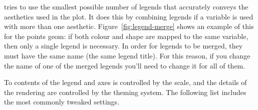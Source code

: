 % 


\ggplot tries to use the smallest possible number of legends that accurately conveys the aesthetics used in the plot.  It does this by combining legends if a variable is used with more than one aesthetic.  Figure~\ref{fig:legend-merge} shows an example of this for the points geom: if both colour and shape are mapped to the same variable, then only a single legend is necessary.  In order for legends to be merged, they must have the same name (the same legend title).  For this reason, if you change the name of one of the merged legends you'll need to change it for all of them.

% 


To contents of the legend and axes is controlled by the scale, and the details of the rendering are controlled by the theming system. The following list includes the most commonly tweaked settings.

